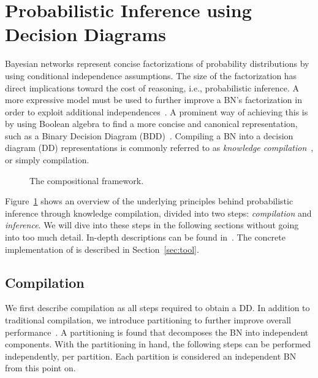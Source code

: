 
\section{Probabilistic Inference using Decision Diagrams}\label{sec:parallel}

Bayesian networks represent concise factorizations of probability distributions by using conditional independence assumptions. The size of the factorization has direct implications toward the cost of reasoning, i.e., probabilistic inference. A more expressive model must be used to further improve a BN's factorization in order to exploit additional independences~\cite{boutilier1996context,friedman1998learning,zhang1996exploiting}. A prominent way of achieving this is by using Boolean algebra to find a more concise and canonical representation, such as a Binary Decision Diagram (BDD)~\cite{bryant1986graph}. Compiling a BN into a decision diagram (DD) representations is commonly referred to as \emph{knowledge compilation}~\cite{darwiche2002knowledge}, or simply compilation.


\begin{figure}[!t]
    \centering

    \scalebox{0.85}{
    
    }
    \caption{The compositional framework.}
    \label{fig:frameworkoverview}
\end{figure}

Figure~\ref{fig:frameworkoverview} shows an overview of the underlying principles behind probabilistic inference through knowledge compilation, divided into two steps: \emph{compilation} and \emph{inference}. We will dive into these steps in the following sections without going into too much detail. In-depth descriptions can be found in~\cite{dal2021compositional}. The concrete implementation of \toolname is described in Section~\ref{sec:tool}.

\subsection{Compilation}

We first describe compilation as all steps required to obtain a DD. In addition to traditional compilation, we introduce partitioning to further improve overall performance~\cite{dal2017reducing}.
A partitioning is found that decomposes the BN into independent components. With the partitioning in hand, the following steps can be performed independently, per partition. Each partition is considered an independent BN from this point on.

